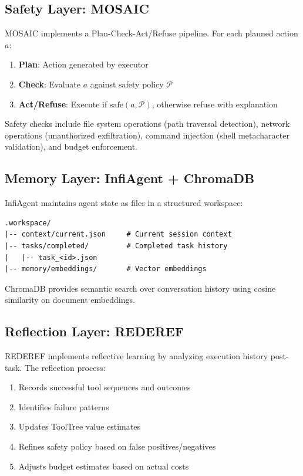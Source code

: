 \documentclass[11pt,a4paper]{article}
\begin{document}
\subsection{Safety Layer: MOSAIC}

MOSAIC implements a Plan-Check-Act/Refuse pipeline. For each planned action $a$:
\begin{enumerate}
    \item \textbf{Plan}: Action generated by executor
    \item \textbf{Check}: Evaluate $a$ against safety policy $\mathcal{P}$
    \item \textbf{Act/Refuse}: Execute if $\text{safe}(a, \mathcal{P})$, otherwise refuse with explanation
\end{enumerate}

Safety checks include file system operations (path traversal detection), network operations (unauthorized exfiltration), command injection (shell metacharacter validation), and budget enforcement.

\subsection{Memory Layer: InfiAgent + ChromaDB}

InfiAgent maintains agent state as files in a structured workspace:
\begin{verbatim}
.workspace/
|-- context/current.json     # Current session context
|-- tasks/completed/         # Completed task history
|   |-- task_<id>.json
|-- memory/embeddings/       # Vector embeddings
\end{verbatim}

ChromaDB provides semantic search over conversation history using cosine similarity on document embeddings.

\subsection{Reflection Layer: REDEREF}

REDEREF implements reflective learning by analyzing execution history post-task. The reflection process:
\begin{enumerate}
    \item Records successful tool sequences and outcomes
    \item Identifies failure patterns
    \item Updates ToolTree value estimates
    \item Refines safety policy based on false positives/negatives
    \item Adjusts budget estimates based on actual costs
\end{enumerate}
\end{document}
